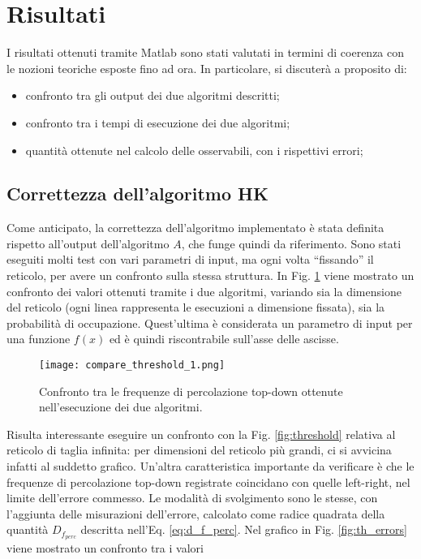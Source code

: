 \section{Risultati}
I risultati ottenuti tramite Matlab sono stati valutati in termini di coerenza con 
le nozioni teoriche esposte fino ad ora. In particolare, si discuterà a proposito di:
\begin{itemize}
    \item confronto tra gli output dei due algoritmi descritti;
    \item confronto tra i tempi di esecuzione dei due algoritmi;
    \item quantità ottenute nel calcolo delle osservabili, con i rispettivi errori;
\end{itemize}

\subsection*{Correttezza dell'algoritmo HK}
Come anticipato, la correttezza dell'algoritmo implementato è stata definita rispetto 
all'output dell'algoritmo $A$, che funge quindi da riferimento.
Sono stati eseguiti molti test con vari parametri di input, ma ogni volta 
``fissando'' il reticolo, per avere un confronto sulla stessa struttura.
In Fig. \ref{fig:compare_threshold} viene mostrato un confronto dei valori 
ottenuti tramite i due algoritmi, variando sia la dimensione del reticolo (ogni linea
rappresenta le esecuzioni a dimensione fissata), sia la probabilità di occupazione.
Quest'ultima è considerata un parametro di input per una funzione $f(x)$ ed è
quindi riscontrabile sull'asse delle ascisse. 
\begin{figure}[ht]
    \texttt{[image: compare\_threshold\_1.png]}
    \caption{Confronto tra le frequenze di percolazione top-down ottenute nell'esecuzione
    dei due algoritmi.}
    \label{fig:compare_threshold}
\end{figure}
Risulta interessante eseguire un confronto con la Fig. \ref{fig:threshold} 
relativa al reticolo di taglia infinita: per dimensioni del reticolo più grandi, ci 
si avvicina infatti al suddetto grafico.
Un'altra caratteristica importante da verificare è che le frequenze di 
percolazione top-down registrate coincidano con quelle left-right, nel limite 
dell'errore commesso. Le modalità di svolgimento sono le stesse, con l'aggiunta 
delle misurazioni dell'errore, calcolato come radice quadrata della quantità 
$D_{f_{perc}}$ descritta nell'Eq. \ref{eq:d_f_perc}.
Nel grafico in Fig. \ref{fig:th_errors} viene mostrato un confronto tra i valori 
